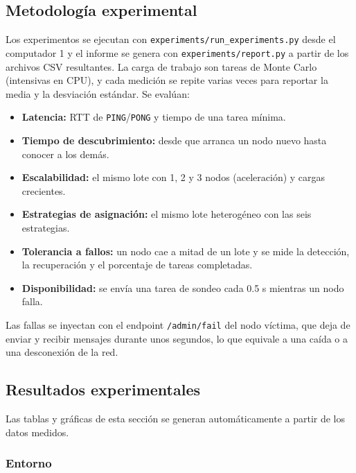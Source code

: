\subsection{Metodología experimental}

Los experimentos se ejecutan con \texttt{experiments/run\_experiments.py} desde el computador 1 y el
informe se genera con \texttt{experiments/report.py} a partir de los archivos CSV resultantes. La carga
de trabajo son tareas de Monte Carlo (intensivas en CPU), y cada medición se repite varias veces para
reportar la media y la desviación estándar. Se evalúan:

\begin{itemize}
\item \textbf{Latencia:} RTT de \texttt{PING}/\texttt{PONG} y tiempo de una tarea mínima.
\item \textbf{Tiempo de descubrimiento:} desde que arranca un nodo nuevo hasta conocer a los demás.
\item \textbf{Escalabilidad:} el mismo lote con 1, 2 y 3 nodos (aceleración) y cargas crecientes.
\item \textbf{Estrategias de asignación:} el mismo lote heterogéneo con las seis estrategias.
\item \textbf{Tolerancia a fallos:} un nodo cae a mitad de un lote y se mide la detección, la
recuperación y el porcentaje de tareas completadas.
\item \textbf{Disponibilidad:} se envía una tarea de sondeo cada 0.5 s mientras un nodo falla.
\end{itemize}

Las fallas se inyectan con el endpoint \texttt{/admin/fail} del nodo víctima, que deja de enviar y
recibir mensajes durante unos segundos, lo que equivale a una caída o a una desconexión de la red.

\subsection{Resultados experimentales}

Las tablas y gráficas de esta sección se generan automáticamente a partir de los datos medidos.


\subsubsection{Entorno}

